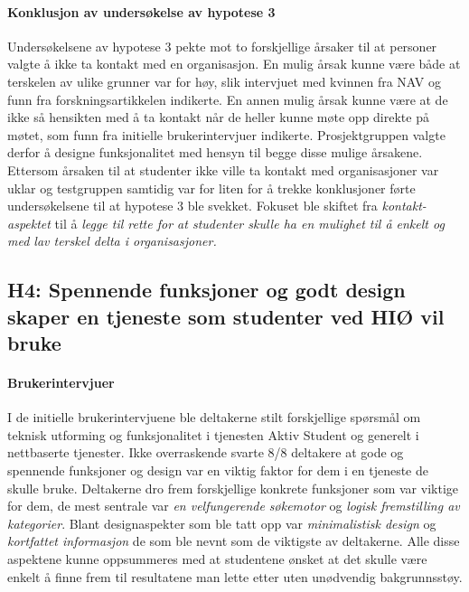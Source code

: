 \paragraph{Konklusjon av undersøkelse av hypotese 3}
Undersøkelsene av hypotese 3 pekte mot to forskjellige årsaker til at personer valgte å ikke ta kontakt med en organisasjon. En mulig årsak kunne være både at terskelen av ulike grunner var for høy, slik intervjuet med kvinnen fra NAV og funn fra forskningsartikkelen indikerte. En annen mulig årsak kunne være at de ikke så hensikten med å ta kontakt når de heller kunne møte opp direkte på møtet, som funn fra initielle brukerintervjuer indikerte. Prosjektgruppen valgte derfor å designe funksjonalitet med hensyn til begge disse mulige årsakene. Ettersom årsaken til at studenter ikke ville ta kontakt med organisasjoner var uklar og testgruppen samtidig var for liten for å trekke konklusjoner førte undersøkelsene til at hypotese 3 ble svekket. Fokuset ble skiftet fra {\em kontakt-aspektet} til å {\em legge til rette for at studenter skulle ha en mulighet til å enkelt og med lav terskel delta i organisasjoner.}


\subsection{H4: Spennende funksjoner og godt design skaper en tjeneste som studenter ved HIØ vil bruke}

\paragraph{Brukerintervjuer}
I de initielle brukerintervjuene ble deltakerne stilt forskjellige spørsmål om teknisk utforming og funksjonalitet i tjenesten Aktiv Student og generelt i nettbaserte tjenester. Ikke overraskende svarte 8/8 deltakere at gode og spennende funksjoner og design var en viktig faktor for dem i en tjeneste de skulle bruke. Deltakerne dro frem forskjellige konkrete funksjoner som var viktige for dem, de mest sentrale var {\em en velfungerende søkemotor} og {\em logisk fremstilling av kategorier}. Blant designaspekter som ble tatt opp var {\em minimalistisk design} og {\em kortfattet informasjon} de som ble nevnt som de viktigste av deltakerne. Alle disse aspektene kunne oppsummeres med at studentene ønsket at det skulle være enkelt å finne frem til resultatene man lette etter uten unødvendig bakgrunnsstøy.

